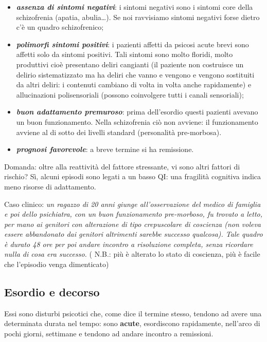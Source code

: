 \begin{itemize}
\item
  \textbf{\emph{assenza di sintomi negativi}}: i sintomi negativi sono i
  sintomi core della schizofrenia (apatia, abulia\ldots{}). Se noi
  ravvisiamo sintomi negativi forse dietro c'è un quadro schizofrenico;
\item
  \textbf{\emph{polimorfi sintomi positivi}}: i pazienti affetti da
  psicosi acute brevi sono affetti solo da sintomi positivi. Tali
  sintomi sono molto floridi, molto produttivi cioè presentano deliri
  cangianti (il paziente non costruisce un delirio sistematizzato ma ha
  deliri che vanno e vengono e vengono sostituiti da altri deliri: i
  contenuti cambiano di volta in volta anche rapidamente) e
  allucinazioni polisensoriali (possono coinvolgere tutti i canali
  sensoriali);
\item
  \textbf{\emph{buon adattamento premuroso}}: prima dell'esordio questi
  pazienti avevano un buon funzionamento. Nella schizofrenia ciò non
  avviene: il funzionamento avviene al di sotto dei livelli standard
  (personalità pre-morbosa).
\item
  \textbf{\emph{prognosi favorevole}}: a breve termine si ha remissione.
\end{itemize}

Domanda: oltre alla reattività del fattore stressante, vi sono altri
fattori di rischio? Sì, alcuni episodi sono legati a un basso QI: una
fragilità cognitiva indica meno risorse di adattamento.

Caso clinico: \emph{un ragazzo di 20 anni giunge all'osservazione del
medico di famiglia e poi dello psichiatra, con un buon funzionamento
pre-morboso, fu trovato a letto, per mano ai genitori con alterazione di
tipo crepuscolare di coscienza (non voleva essere abbandonato dai
genitori altrimenti sarebbe successo qualcosa). Tale quadro è durato 48
ore per poi andare incontro a risoluzione completa, senza ricordare
nulla di cosa era successo.} ( N.B.: più è alterato lo stato di
coscienza, più è facile che l'episodio venga dimenticato)

\subsection{Esordio e decorso}

Essi sono disturbi psicotici che, come dice il termine stesso, tendono
ad avere una determinata durata nel tempo: sono \textbf{acute},
esordiscono rapidamente, nell'arco di pochi giorni, settimane e tendono
ad andare incontro a remissioni.

